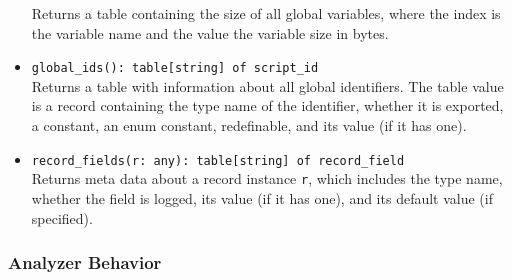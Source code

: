 \documentclass[10pt,landscape]{article}
\begin{document}
\begin{multicols*}{2}
\begin{itemize}
    Returns a table containing the size of all global variables, where the
    index is the variable name and the value the variable size in bytes.
  \item \verb|global_ids(): table[string] of script_id|\\
    Returns a table with information about all global identifiers. The table
    value is a record containing the type name of the identifier, whether it is
    exported, a constant, an enum constant, redefinable, and its value (if it
    has one).
  \item \verb|record_fields(r: any): table[string] of record_field|\\
    Returns meta data about a record instance \texttt{r}, which includes the
    type name, whether the field is logged, its value (if it has one), and its
    default value (if specified).
\end{itemize}

\subsubsection*{Analyzer Behavior}


\end{multicols*}
\end{document}
